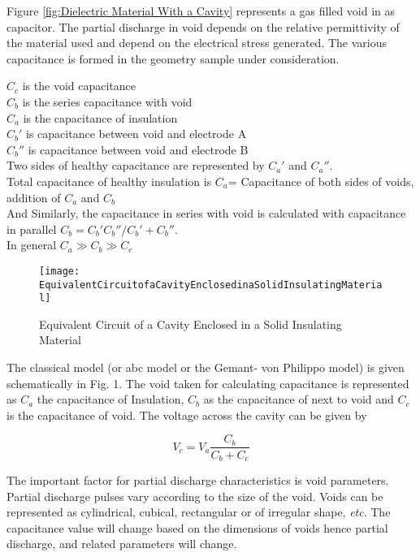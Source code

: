 Figure \ref{fig:Dielectric Material With a Cavity} represents a gas filled void in as capacitor. The partial discharge in void depends on the relative permittivity of the material used and depend on the electrical stress generated. The various capacitance is formed in the geometry sample under consideration.

$C_c$ is the void capacitance\\
$C_b$ is the series capacitance with void\\
$C_a$ is the capacitance of insulation \\
$C_b'$ is capacitance between void and electrode A\\
$C_b''$ is capacitance between void and electrode B\\
Two sides of healthy capacitance are represented by $C_a'$ and $C_a''$. \\
Total capacitance of healthy insulation is $C_a$= Capacitance of both sides of voids, addition of $C_a$ and $C_b$\\
And Similarly, the capacitance in series with void is calculated with capacitance in parallel $C_b = C_b' C_b''/ C_b'+C_b''$.\\
In general $C_a \gg C_b \gg C_c$

\begin{figure}[h!]
\centering
\texttt{[image: EquivalentCircuitofaCavityEnclosedinaSolidInsulatingMaterial]}
\caption{Equivalent Circuit of a Cavity Enclosed in a Solid Insulating Material}
\label{fig:Equivalent Circuit of a Cavity Enclosed in a Solid Insulating Material}
\end{figure}

The classical model (or abc model or the Gemant- von Philippo model) is given schematically in Fig. 1. The void taken for calculating capacitance is represented as $C_a$ the capacitance of Insulation, $C_b$ as the capacitance of next to void and $C_c$ is the capacitance of void. The voltage across the cavity can be given by 

\begin{equation}
V_c = V_a \frac{C_b}{C_b + C_c}
\end{equation}

The important factor for partial discharge characteristics is void parameters. Partial discharge pulses vary according to the size of the void. Voids can be represented as cylindrical, cubical, rectangular or of irregular shape, \textit{etc}. The capacitance value will change based on the dimensions of voids hence partial discharge, and related parameters will change.

